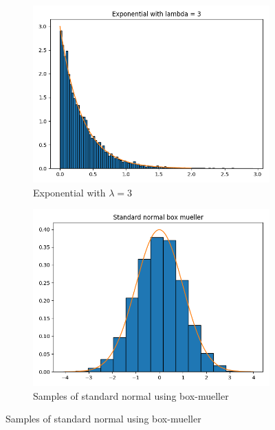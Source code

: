 \begin{figure}[H]
        \centering
        \begin{subfigure}[H]{0.475\textwidth}
            \centering
            \includegraphics[width=\textwidth]{exp.png}
            \caption[Network2]%
            {{\small Exponential with $\lambda = 3$}}    
            \label{fig:mean and std of net14}
        \end{subfigure}
        \hfill
        \begin{subfigure}[H]{0.475\textwidth}  
            \centering 
            \includegraphics[width=\textwidth]{normal.png}
            \caption[]%
            {{\small Samples of standard normal using box-mueller}}    
            \label{fig:mean and std of net24}

\end{subfigure}
\end{figure}
